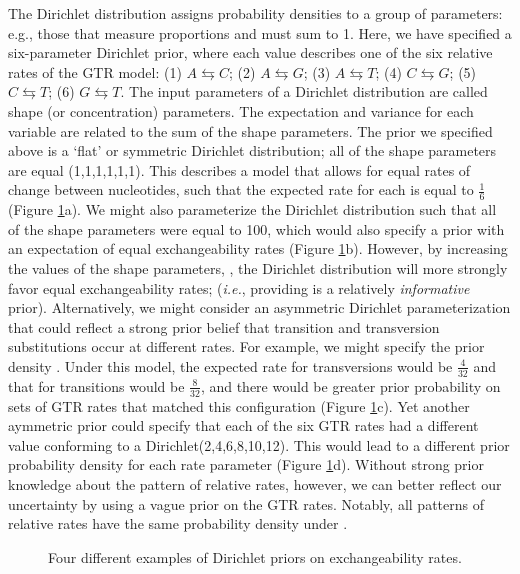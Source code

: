 The Dirichlet distribution assigns probability densities to a group of parameters: e.g., those that measure proportions and must sum to 1. 
Here, we have specified a six-parameter Dirichlet prior, where each value describes one of the six relative rates of the GTR model: 
(1) $A\leftrightarrows C$; (2) $A\leftrightarrows G$; (3) $A\leftrightarrows T$; (4) $C\leftrightarrows G$; (5) $C\leftrightarrows T$; (6) $G\leftrightarrows T$. 
The input parameters of a Dirichlet distribution are called shape (or concentration) parameters. 
The expectation and variance for each variable are related to the sum of the shape parameters.
The prior we specified above is a `flat' or symmetric Dirichlet distribution; all of the shape parameters are equal (1,1,1,1,1,1).
This describes a model that allows for equal rates of change between nucleotides, such that the expected rate for each is equal to $\frac{1}{6}$ (Figure \ref{dirichletFig}a).
We might also parameterize the Dirichlet distribution such that all of the shape parameters were equal to 100, which would also specify a prior with an expectation of equal exchangeability rates (Figure \ref{dirichletFig}b). 
However, by increasing the values of the shape parameters, , the Dirichlet distribution will more strongly favor equal exchangeability rates; ({\it i.e.}, providing is a relatively {\em informative} prior). 
Alternatively, we might consider an asymmetric Dirichlet parameterization that could reflect a strong prior belief that transition and transversion substitutions occur at different rates.
For example, we might specify the prior density .   
Under this model, the expected rate for transversions would be $\frac{4}{32}$ and that for transitions would be $\frac{8}{32}$, and there would be greater prior probability on sets of GTR rates that matched this configuration (Figure \ref{dirichletFig}c). 
Yet another aymmetric prior could specify that each of the six GTR rates had a different value conforming to a Dirichlet(2,4,6,8,10,12). 
This would lead to a different prior probability density for each rate parameter (Figure \ref{dirichletFig}d).
Without strong prior knowledge about the pattern of relative rates, however, we can better reflect our uncertainty by using a vague prior on the GTR rates. 
Notably, all patterns of relative rates have the same probability density under .
\begin{figure}[h!]
\centering
{}
\caption{\small Four different examples of Dirichlet priors on exchangeability rates.}
\label{dirichletFig}
\end{figure}


